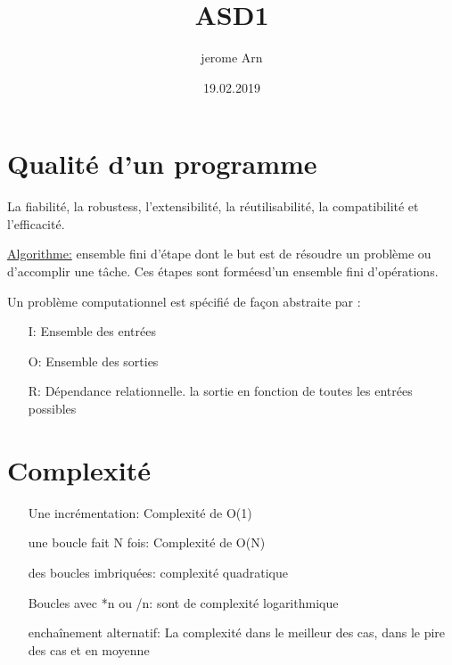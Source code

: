 \documentclass{article}
\title{ASD1}
\author{jerome Arn}
\date{19.02.2019}
\begin{document}
\maketitle
\newpage

\tableofcontents
\newpage

\section{Qualité d'un programme}
La fiabilité, la robustess, l'extensibilité, la réutilisabilité, la compatibilité et l'efficacité.

\uline{Algorithme:} ensemble fini d'étape dont le but est de résoudre un problème ou d'accomplir une tâche. Ces étapes sont forméesd'un ensemble fini d'opérations. 

\newline Un problème computationnel est spécifié de façon abstraite par :
\bigskip
\begin{itemize}
	\item[I:] Ensemble des entrées 
	\item[O:] Ensemble des sorties
    	\item[R:] Dépendance relationnelle. la sortie en fonction de toutes les entrées possibles
\end{itemize}
\bigskip

\section{Complexité}
\begin{itemize}
	\item[Une incrémentation:]Complexité de O(1)
	\item[une boucle fait N fois:] Complexité de O(N)
    	\item[des boucles imbriquées:] complexité quadratique 
	\item[Boucles avec *n ou /n:] sont de complexité logarithmique
	\item[enchaînement alternatif:] La complexité dans le meilleur des cas, dans le pire des cas et en moyenne
\end{itemize}
\bigskip

\newline 
\end{document}
